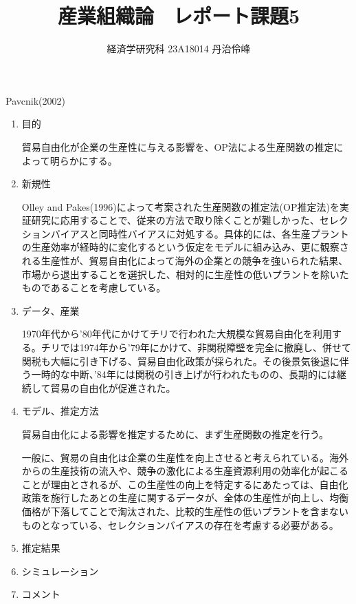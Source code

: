 \documentclass{jsarticle}
\begin{document}
\title{産業組織論　レポート課題5}
\author{経済学研究科 23A18014 丹治伶峰}
\date{}
\maketitle

Pavcnik(2002)

\begin{enumerate}

\item 目的

貿易自由化が企業の生産性に与える影響を、OP法による生産関数の推定によって明らかにする。

\item 新規性

Olley and Pakes(1996)によって考案された生産関数の推定法(OP推定法)を実証研究に応用することで、従来の方法で取り除くことが難しかった、セレクションバイアスと同時性バイアスに対処する。具体的には、各生産プラントの生産効率が経時的に変化するという仮定をモデルに組み込み、更に観察される生産性が、貿易自由化によって海外の企業との競争を強いられた結果、市場から退出することを選択した、相対的に生産性の低いプラントを除いたものであることを考慮している。

\item データ、産業

1970年代から'80年代にかけてチリで行われた大規模な貿易自由化を利用する。チリでは1974年から'79年にかけて、非関税障壁を完全に撤廃し、併せて関税も大幅に引き下げる、貿易自由化政策が採られた。その後景気後退に伴う一時的な中断、'84年には関税の引き上げが行われたものの、長期的には継続して貿易の自由化が促進された。

\item モデル、推定方法

貿易自由化による影響を推定するために、まず生産関数の推定を行う。

一般に、貿易の自由化は企業の生産性を向上させると考えられている。海外からの生産技術の流入や、競争の激化による生産資源利用の効率化が起こることが理由とされるが、この生産性の向上を特定するにあたっては、自由化政策を施行したあとの生産に関するデータが、全体の生産性が向上し、均衡価格が下落してことで淘汰された、比較的生産性の低いプラントを含まないものとなっている、セレクションバイアスの存在を考慮する必要がある。

\item 推定結果
 


\item シミュレーション
 


\item コメント



\end{enumerate}
\end{document}
